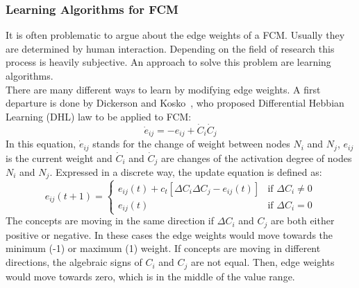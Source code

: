 \documentclass[conference]{IEEEtran}
\begin{document}
\subsubsection{Learning Algorithms for FCM}
It is often problematic to argue about the edge weights of a FCM. Usually they are determined by human interaction. Depending on the field of research this process is heavily subjective. An approach to solve this problem are learning algorithms.\\
There are many different ways to learn by modifying edge weights. A first departure is done by Dickerson and Kosko~\cite{dickerson1993}, who proposed Differential Hebbian Learning (DHL) law to be applied to FCM:
\begin{equation}
\dot{e}_{ij} = -e_{ij} + \dot{C}_{i}\dot{C}_{j}
\end{equation}
In this equation, \begin{math} \dot{e}_{ij} \end{math} stands for the change of weight between nodes \begin{math}N_{i} \end{math} and \begin{math}N_{j} \end{math}, \begin{math} e_{ij} \end{math} is the current weight and \begin{math} \dot{C}_{i} \end{math} and \begin{math} \dot{C}_{j} \end{math} are changes of the activation degree of nodes \begin{math} N_{i} \end{math} and \begin{math} N_{j} \end{math}. Expressed in a discrete way, the update equation is defined as:
\begin{equation}
e_{ij}(t+1)= \begin{cases}
e_{ij}(t) + c_{t} [ \Delta C_{i} \Delta C_{j} - e_{ij}(t)] & \text{if } \Delta C_{i} \neq 0\\
e_{ij}(t) & \text{if } \Delta C_{i} = 0
\end{cases}
\end{equation}
The concepts are moving in the same direction if \begin{math} \Delta C_{i} \end{math} and \begin{math} C_{j} \end{math} are both either positive or negative. In these cases the edge weights would move towards the minimum (-1) or maximum (1) weight. If concepts are moving in different directions, the algebraic signs of \begin{math} C_{i} \end{math} and \begin{math} C_{j} \end{math} are not equal. Then, edge weights would move towards zero, which is in the middle of the value range.\\
\end{document}

